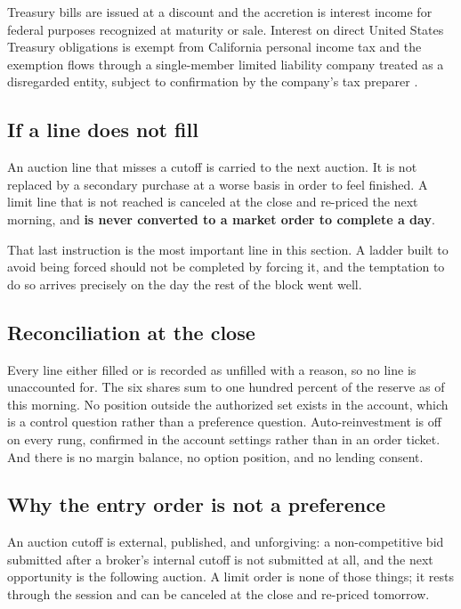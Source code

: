 Treasury bills are issued at a discount and the accretion is interest income for
federal purposes recognized at maturity or sale. Interest on direct United States
Treasury obligations is exempt from California personal income tax and the
exemption flows through a single-member limited liability company treated as a
disregarded entity, subject to confirmation by the company's tax preparer
\cite{treasuryyield2026}.

\subsection{If a line does not fill}

An auction line that misses a cutoff is carried to the next auction. It is not
replaced by a secondary purchase at a worse basis in order to feel finished. A
limit line that is not reached is canceled at the close and re-priced the next
morning, and \textbf{is never converted to a market order to complete a day}.

That last instruction is the most important line in this section. A ladder built
to avoid being forced should not be completed by forcing it, and the temptation
to do so arrives precisely on the day the rest of the block went well.

\subsection{Reconciliation at the close}

Every line either filled or is recorded as unfilled with a reason, so no line is
unaccounted for. The six shares sum to one hundred percent of the reserve as of
this morning. No position outside the authorized set exists in the account, which
is a control question rather than a preference question. Auto-reinvestment is off
on every rung, confirmed in the account settings rather than in an order ticket.
And there is no margin balance, no option position, and no lending consent.

\subsection{Why the entry order is not a preference}

An auction cutoff is external, published, and unforgiving: a non-competitive bid
submitted after a broker's internal cutoff is not submitted at all, and the next
opportunity is the following auction. A limit order is none of those things; it
rests through the session and can be canceled at the close and re-priced
tomorrow.

